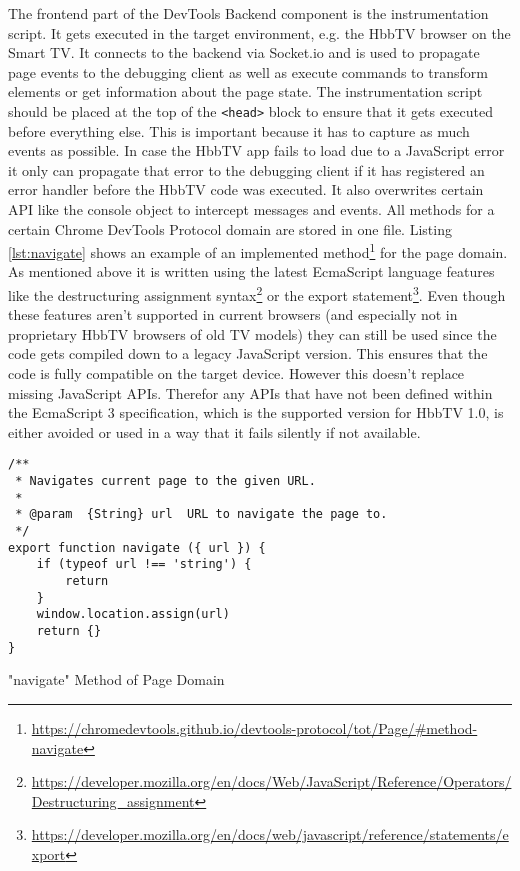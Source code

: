 The frontend part of the DevTools Backend component is the instrumentation script. It gets executed
in the target environment, e.g. the HbbTV browser on the Smart TV. It connects to the backend via
Socket.io and is used to propagate page events to the debugging client as well as execute commands
to transform elements or get information about the page state. The instrumentation script should be
placed at the top of the \texttt{<head>} block to ensure that it gets executed before everything
else. This is important because it has to capture as much events as possible. In case the HbbTV app
fails to load due to a JavaScript error it only can propagate that error to the debugging client if
it has registered an error handler before the HbbTV code was executed. It also overwrites certain API
like the console object to intercept messages and events. All methods for a certain Chrome DevTools
Protocol domain are stored in one file. Listing \ref{lst:navigate} shows an example of an implemented
method\footnote{\url{https://chromedevtools.github.io/devtools-protocol/tot/Page/\#method-navigate}}
for the page domain. As mentioned above it is written using the latest EcmaScript language features
like the destructuring assignment syntax\footnote{\url{https://developer.mozilla.org/en/docs/Web/JavaScript/Reference/Operators/Destructuring_assignment}}
or the export statement\footnote{\url{https://developer.mozilla.org/en/docs/web/javascript/reference/statements/export}}.
Even though these features aren't supported in current browsers (and especially not in proprietary
HbbTV browsers of old TV models) they can still be used since the code gets compiled down to a legacy
JavaScript version. This ensures that the code is fully compatible on the target device. However this
doesn't replace missing JavaScript APIs. Therefor any APIs that have not been defined within the
EcmaScript 3 specification, which is the supported version for HbbTV 1.0, is either avoided or used
in a way that it fails silently if not available.

\begin{listing}[H]
\begin{verbatim}
/**
 * Navigates current page to the given URL.
 *
 * @param  {String} url  URL to navigate the page to.
 */
export function navigate ({ url }) {
    if (typeof url !== 'string') {
        return
    }
    window.location.assign(url)
    return {}
}
\end{verbatim}
\caption{"navigate" Method of Page Domain}
\label{lst:navigate}
\end{listing}

